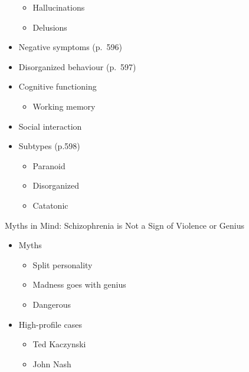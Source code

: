 \documentclass[
]{book}
\providecommand{\tightlist}{%
  \setlength{\itemsep}{0pt}\setlength{\parskip}{0pt}}
\begin{document}
\begin{reflect}
\begin{itemize}
  \begin{itemize}
  \tightlist
  \item
    Hallucinations\\
  \item
    Delusions\\
  \end{itemize}
\item
  Negative symptoms (p.~596)\\
\item
  Disorganized behaviour (p.~597)\\
\item
  Cognitive functioning

  \begin{itemize}
  \tightlist
  \item
    Working memory\\
  \end{itemize}
\item
  Social interaction\\
\item
  Subtypes (p.598)

  \begin{itemize}
  \tightlist
  \item
    Paranoid\\
  \item
    Disorganized\\
  \item
    Catatonic
  \end{itemize}
\end{itemize}

Myths in Mind: Schizophrenia is Not a Sign of Violence or Genius

\begin{itemize}
\tightlist
\item
  Myths

  \begin{itemize}
  \tightlist
  \item
    Split personality\\
  \item
    Madness goes with genius\\
  \item
    Dangerous\\
  \end{itemize}
\item
  High-profile cases

  \begin{itemize}
  \tightlist
  \item
    Ted Kaczynski\\
  \item
    John Nash


\end{itemize}
\end{itemize}
\end{reflect}
\end{document}
